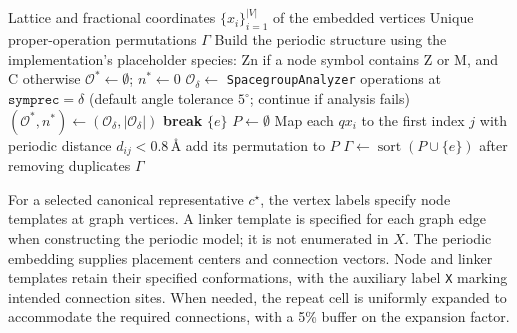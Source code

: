 \documentclass[a5paper, 10pt]{article}
\begin{document}
\begin{algorithm}[htbp]
\caption{Numerical construction of the embedded-net permutation group}
\label{alg:gamma_construction}
\scriptsize
\begin{algorithmic}[1]
\Require Lattice and fractional coordinates $\{x_i\}_{i=1}^{|V|}$ of the embedded vertices
\Ensure Unique proper-operation permutations $\Gamma$
\State Build the periodic structure using the implementation's placeholder species: Zn if a node symbol contains Z or M, and C otherwise
\State $\mathcal{O}^*\gets\emptyset$; $n^*\gets0$
    \State $\mathcal{O}_{\delta}\gets$ \texttt{SpacegroupAnalyzer} operations at $\texttt{symprec}=\delta$ (default angle tolerance $5^\circ$; continue if analysis fails)
        \State $(\mathcal{O}^*,n^*)\gets(\mathcal{O}_{\delta},|\mathcal{O}_{\delta}|)$
    \EndIf
     \State \textbf{break} \EndIf
\EndFor
{} \State \Return $\{e\}$ \EndIf
\State $P\gets\emptyset$
    \State Map each $q x_i$ to the first index $j$ with periodic distance $d_{ij}<0.8\,\text{\AA}$
     \State add its permutation to $P$ \EndIf
\EndFor
\State $\Gamma\gets\operatorname{sort}(P\cup\{e\})$ after removing duplicates
\State \Return $\Gamma$
\end{algorithmic}
\end{algorithm}

For a selected canonical representative $c^\star$, the vertex labels specify node templates at graph vertices. A linker template is specified for each graph edge when constructing the periodic model; it is not enumerated in $X$. The periodic embedding supplies placement centers and connection vectors. Node and linker templates retain their specified conformations, with the auxiliary label \texttt{X} marking intended connection sites. When needed, the repeat cell is uniformly expanded to accommodate the required connections, with a 5\% buffer on the expansion factor.
\end{document}
